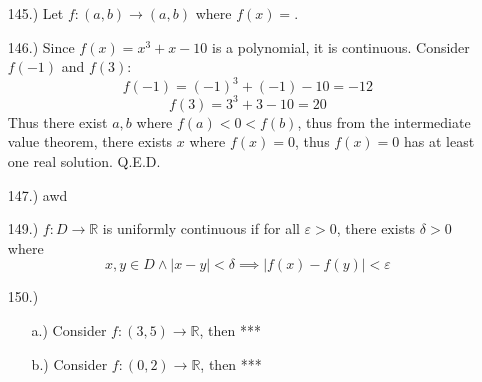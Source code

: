 \documentclass[12pt]{article}
\newcommand{\vertb}[1]{\left\vert#1\right\vert}
\newcommand{\e}{\varepsilon}
\begin{document}
\begin{itemize}
    \item [145.)] Let $f:(a,b)\to(a,b)$ where $f(x)=$.

    \item [146.)] Since $f(x)=x^3+x-10$ is a polynomial, it is continuous. Consider $f(-1)$ and $f(3)$:
    \[f(-1)=(-1)^3+(-1)-10=-12\]
    \[f(3)=3^3+3-10=20\]
    Thus there exist $a,b$ where $f(a)<0<f(b)$, thus from the intermediate value theorem, there exists $x$ where $f(x)=0$, thus $f(x)=0$ has at least one real solution. Q.E.D.

    \item [147.)] awd



    \item [149.)] $f:D\to\mathbb R$ is uniformly continuous if for all $\e>0$, there exists $\delta>0$ where
    \[x,y\in D\land\vertb{x-y}<\delta\implies\vertb{f(x)-f(y)}<\e\]

    \item [150.)] \begin{itemize}
        \item [a.)] Consider $f:(3,5)\to\mathbb R$, then ***

        \item [b.)] Consider $f:(0,2)\to\mathbb R$, then ***
    \end{itemize}



\end{itemize}
\end{document}
